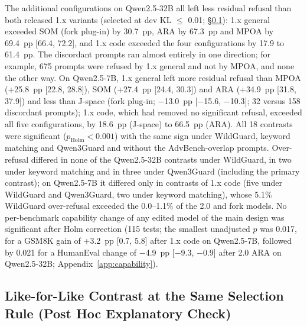 The additional configurations on Qwen2.5-32B all left less residual refusal than both released 1.x variants
(selected at dev KL $\le$ 0.01; \S\ref{sec:res-kl}): 1.x general
exceeded SOM (fork plug-in) by 30.7~pp, ARA by 67.3~pp and MPOA by 69.4~pp [66.4, 72.2], and 1.x code exceeded the
four configurations by 17.9 to 61.4~pp. The discordant prompts ran almost entirely in one direction; for example, 675
prompts were refused by 1.x general and not by MPOA, and none the other way. On Qwen2.5-7B, 1.x general left more
residual refusal than MPOA (+25.8~pp [22.8, 28.8]), SOM (+27.4~pp [24.4, 30.3]) and ARA (+34.9~pp [31.8, 37.9]) and
less than J-space (fork plug-in; $-$13.0~pp [$-$15.6, $-$10.3]; 32 versus 158 discordant prompts); 1.x code, which
had removed no significant refusal, exceeded all five configurations, by 18.6~pp (J-space) to 66.5~pp (ARA). All 18
contrasts were significant ($p_\mathrm{Holm}<0.001$) with the same sign under WildGuard, keyword matching and
Qwen3Guard and without the AdvBench-overlap prompts. Over-refusal differed in none of the Qwen2.5-32B contrasts under
WildGuard, in two under keyword matching and in three under Qwen3Guard (including the primary contrast); on
Qwen2.5-7B it differed only in contrasts of 1.x code (five under WildGuard and Qwen3Guard, two under keyword
matching), whose 5.1\% WildGuard over-refusal exceeded the 0.0--1.1\% of the 2.0 and fork models. No per-benchmark
capability change of any edited model of the main design was significant after Holm correction (115 tests; the
smallest unadjusted $p$ was 0.017, for a GSM8K gain of +3.2~pp [0.7, 5.8] after 1.x code on Qwen2.5-7B, followed by
0.021 for a HumanEval change of $-$4.9~pp [$-$9.3, $-$0.9] after 2.0 ARA on Qwen2.5-32B;
Appendix~\ref{app:capability}).


\subsection{Like-for-Like Contrast at the Same Selection Rule (Post Hoc Explanatory Check)}
\label{sec:res-kl}

